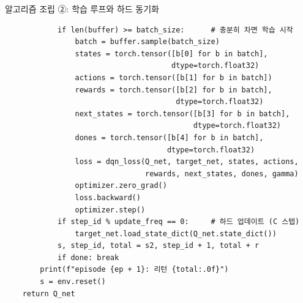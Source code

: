 \documentclass[aspectratio=169,11pt]{beamer}
\begin{document}
\begin{frame}[fragile]{알고리즘 조립 ②: 학습 루프와 하드 동기화}
\begin{lstlisting}
            if len(buffer) >= batch_size:      # 충분히 차면 학습 시작
                batch = buffer.sample(batch_size)
                states = torch.tensor([b[0] for b in batch],
                                      dtype=torch.float32)
                actions = torch.tensor([b[1] for b in batch])
                rewards = torch.tensor([b[2] for b in batch],
                                       dtype=torch.float32)
                next_states = torch.tensor([b[3] for b in batch],
                                           dtype=torch.float32)
                dones = torch.tensor([b[4] for b in batch],
                                     dtype=torch.float32)
                loss = dqn_loss(Q_net, target_net, states, actions,
                                rewards, next_states, dones, gamma)
                optimizer.zero_grad()
                loss.backward()
                optimizer.step()
            if step_id % update_freq == 0:     # 하드 업데이트 (C 스텝)
                target_net.load_state_dict(Q_net.state_dict())
            s, step_id, total = s2, step_id + 1, total + r
            if done: break
        print(f"episode {ep + 1}: 리턴 {total:.0f}")
        s = env.reset()
    return Q_net
\end{lstlisting}
\end{frame}

\end{document}
